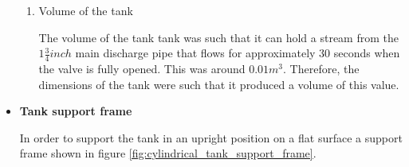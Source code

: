 \begin{itemize}
\begin{enumerate}
    \item Volume of the tank
    \par
    The volume of the tank tank was such that it can hold a stream from the $1 \frac{3}{4} inch$ main discharge pipe that flows for approximately 30 seconds when the valve is fully opened. This was around $0.01m^{3}$. Therefore, the dimensions of the tank were such that it produced a volume of this value.
\end{enumerate}


\par
\item \textbf{Tank support frame}
\par
In order to support the tank in an upright position on a flat surface a support frame shown in figure \ref{fig:cylindrical_tank_support_frame}.


\end{itemize}
